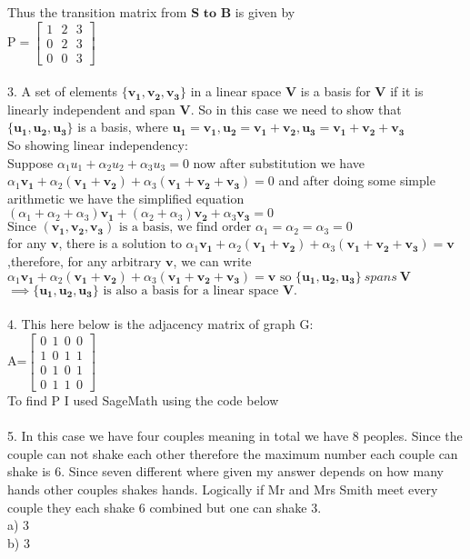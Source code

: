 \documentclass[10pt,a4paper]{article}
\numberwithin{equation}{section}
\begin{document}
Thus the transition matrix from $\mathbf{S \text{ to } B}$ is given by \\
$\text{P}=\begin{bmatrix}
	1 ~~~ 2 ~~~ 3 \\
	0 ~~~ 2 ~~~ 3 \\
	0 ~~~ 0 ~~~ 3
\end{bmatrix}$ \\
~\\
3. A set of elements $\{\mathbf{v_{1},v_{2},v_{3}}\}$ in a linear space $\mathbf{V}$ is a basis for $\mathbf{V}$ if it is linearly independent and span $\mathbf{V}$. So in this case we need to show that $\{\mathbf{u_{1},u_{2},u_{3}}\}$ is a basis, where  $\mathbf{u_{1}=v_{1},u_{2}=v_{1}+v_{2},u_{3}=v_{1}+v_{2}+v_{3}}$ \\
So showing linear independency: \\
Suppose $\alpha_{1}u_{1}+\alpha_{2}u_{2}+\alpha_{3}u_{3}=0$ now after substitution we have \\ $\alpha_{1}\mathbf{v_{1}}+\alpha_{2}(\mathbf{v_{1}+v_{2}})+\alpha_{3}(\mathbf{v_{1}+v_{2}+v_{3}})=0$ and after doing some simple arithmetic we have the simplified equation \\
$(\alpha_{1}+\alpha_{2}+\alpha_{3})\mathbf{v_{1}}+(\alpha_{2}+\alpha_{3})\mathbf{v_{2}}+\alpha_{3}\mathbf{v_{3}}=0$ \\
$\text{Since } \mathbf{(v_1,v_2,v_3)} \text{ is a basis, we find order }\alpha_{1}=\alpha_{2}=\alpha_{3}=0$ \\ 
for any $\mathbf{v}$, there is a solution to $\alpha_{1}\mathbf{v_{1}}+\alpha_{2}(\mathbf{v_{1}+v_{2}})+\alpha_{3}(\mathbf{v_{1}+v_{2}+v_{3}})=\mathbf{v}$ ,therefore, for any
arbitrary $\mathbf{v}$, we can write $\alpha_{1}\mathbf{v_{1}}+\alpha_{2}(\mathbf{v_{1}+v_{2}})+\alpha_{3}(\mathbf{v_{1}+v_{2}+v_{3}})=\mathbf{v}
\text{ so } \{\mathbf{u_{1},u_{2},u_{3}}\}~ spans~ \mathbf{V}$ \\
$\implies \{\mathbf{u_{1},u_{2},u_{3}}\} \text{ is also a basis for a linear space } \mathbf{V}.$ \\
~\\
4. This here below is the adjacency matrix of graph G: \\
$\text{A=}\begin{bmatrix}
	0 ~~ 1 ~~ 0 ~~ 0 \\
	1 ~~ 0 ~~ 1 ~~ 1 \\
	0 ~~ 1 ~~ 0 ~~ 1 \\
	0 ~~ 1 ~~ 1 ~~ 0
\end{bmatrix}$ \\
To find P I used SageMath using the code below \\

~ \\
5. In this case we have four couples meaning in total we have 8 peoples. Since the couple can not shake each other therefore the maximum number each couple can shake is 6. Since seven different where given my answer depends on how many hands other couples shakes hands. Logically if Mr and Mrs Smith meet every couple they each shake 6 combined but one can shake 3.\\ 
a) 3 \\
b) 3
\end{document}
